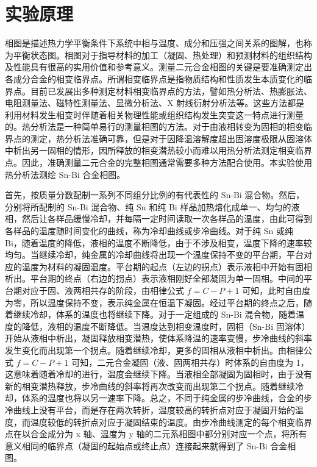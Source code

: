 \documentclass[a4paper,utf8]{article}
\begin{document}
\section{实验原理}%
    相图是描述热力学平衡条件下系统中相与温度、成分和压强之间关系的图解，也称为平衡状态图。相图对于指导材料的加工（凝固、热处理）和预测材料的组织结构及性能具有很高的实用价值和参考意义。测量二元合金相图的关键是要准确测定出各成分合金的相变临界点。所谓相变临界点是指物质结构和性质发生本质变化的临界点。目前已发展出多种测定材料相变临界点的方法，譬如热分析法、热膨胀法、电阻测量法、磁特性测量法、显微分析法、X 射线衍射分析法等。这些方法都是利用材料发生相变时伴随着相关物理性能或组织结构发生突变这一特点进行测量的。热分析法是一种简单易行的测量相图的方法。对于由液相转变为固相的相变临界点的测定，热分析法准确可靠，但是对于因降温溶解度超出固溶度极限从固溶体中析出另一固相的情形，因所释放的相变潜热较小而难以用热分析法测定相变临界点。因此，准确测量二元合金的完整相图通常需要多种方法配合使用。本实验使用热分析法测绘 Sn-Bi 合金相图。\par
    首先，按质量分数配制一系列不同组分比例的有代表性的 Sn-Bi 混合物。然后，分别将所配制的 Sn-Bi 混合物、纯 Sn 和纯 Bi 样品加热熔化成单一、均匀的液相，然后让各样品缓慢冷却，并每隔一定时间读取一次各样品的温度，由此可得到各样品的温度随时间变化的曲线，称为冷却曲线或步冷曲线。对于纯 Sn 或纯 Bi，随着温度的降低，液相的温度不断降低，由于不涉及相变，温度下降的速率较均匀。当继续冷却，纯金属的冷却曲线将出现一个温度保持不变的平台期，平台对应的温度为材料的凝固温度。平台期的起点（左边的拐点）表示液相中开始有固相析出。平台期的终点（右边的拐点）表示液相刚好全部凝固为单一固相。中间的平台期对应于固、液两相共存的阶段，由相律公式 $f=C-P+1$ 可知，此时自由度为零，所以温度保持不变，表示纯金属在恒温下凝固。经过平台期的终点之后，随着继续冷却，体系的温度也将继续下降。对于一定组成的 Sn-Bi 混合物，随着温度的降低，液相的温度不断降低。当温度达到相变温度时，固相（Sn-Bi 固溶体）开始从液相中析出，凝固释放相变潜热，使体系降温的速率变慢，步冷曲线的斜率发生变化而出现第一个拐点。随着继续冷却，更多的固相从液相中析出。由相律公式 $f=C-P+1$ 可知，二元合金凝固（液、固两相共存）时体系的自由度为 1，这意味着随着冷却的进行，温度会继续下降。当液相全部凝固为固相时，由于没有新的相变潜热释放，步冷曲线的斜率将再次改变而出现第二个拐点。随着继续冷却，体系的温度也将以另一速率下降。总之，不同于纯金属的步冷曲线，合金的步冷曲线上没有平台，而是存在两次转折，温度较高的转折点对应于凝固开始的温度，而温度较低的转折点对应于凝固结束的温度。由步冷曲线测定的每个相变临界点在以合金成分为 x 轴、温度为 y 轴的二元系相图中都分别对应一个点，将所有意义相同的临界点（凝固的起始点或终止点）连接起来就得到了 Sn-Bi 合金相图。
    
\end{document}

